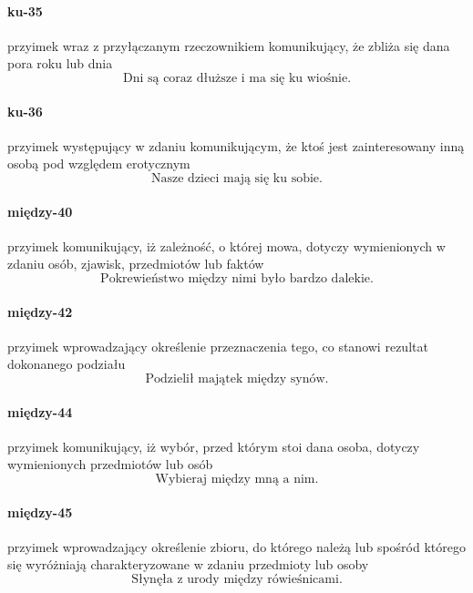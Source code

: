 \documentclass[a4paper, 12pt]{article}
\theoremstyle{remark}
\begin{document}
\paragraph{ku-35}\label{prep-35}	przyimek wraz z przyłączanym rzeczownikiem komunikujący, że zbliża się dana pora roku lub dnia
\begin{equation}
\text{Dni są coraz dłuższe i ma się ku wiośnie.}
\end{equation}
\paragraph{ku-36}\label{prep-36}	przyimek występujący w zdaniu komunikującym, że ktoś jest zainteresowany inną osobą pod względem erotycznym
\begin{equation}
\text{Nasze dzieci mają się ku sobie.}
\end{equation}
\paragraph{między-40}\label{prep-40}	przyimek komunikujący, iż zależność, o której mowa, dotyczy wymienionych w zdaniu osób, zjawisk, przedmiotów lub faktów
\begin{equation}
\text{Pokrewieństwo między nimi było bardzo dalekie.}
\end{equation}
\paragraph{między-42}\label{prep-42}	przyimek wprowadzający określenie przeznaczenia tego, co stanowi rezultat dokonanego podziału
\begin{equation}
\text{Podzielił majątek między synów.}
\end{equation}
\paragraph{między-44}\label{prep-44}	przyimek komunikujący, iż wybór, przed którym stoi dana osoba, dotyczy wymienionych przedmiotów lub osób
\begin{equation}
\text{Wybieraj między mną a nim.}
\end{equation}
\paragraph{między-45}\label{prep-45}	przyimek wprowadzający określenie zbioru, do którego należą lub spośród którego się wyróżniają charakteryzowane w zdaniu przedmioty lub osoby
\begin{equation}
\text{Słynęła z urody między rówieśnicami.}
\end{equation}
\end{document}
